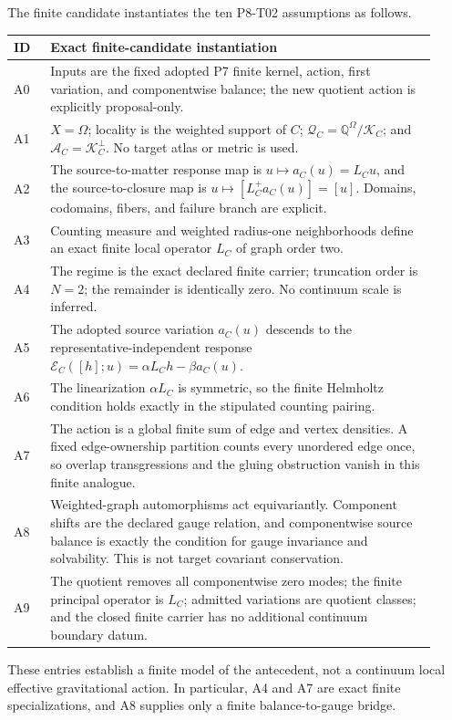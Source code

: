 \documentclass[11pt]{article}
\newcommand{\Q}{\mathbb Q}
\newcommand{\Aspace}{\mathcal A_C}
\newcommand{\Qspace}{\mathcal Q_C}
\newcommand{\Kspace}{\mathcal K_C}
\begin{document}
The finite candidate instantiates the ten P8-T02 assumptions as follows.
\begin{longtable}{p{0.08\linewidth}p{0.84\linewidth}}
\toprule
ID & Exact finite-candidate instantiation\\
\midrule
A0 &
Inputs are the fixed adopted P7 finite kernel, action, first variation, and
componentwise balance; the new quotient action is explicitly proposal-only.\\
A1 &
\(X=\Omega\); locality is the weighted support of \(C\);
\(\Qspace=\Q^\Omega/\Kspace\); and \(\Aspace=\Kspace^\perp\).  No target
atlas or metric is used.\\
A2 &
The source-to-matter response map is \(u\mapsto a_C(u)=L_Cu\), and the
source-to-closure map is \(u\mapsto[L_C^+a_C(u)]=[u]\).  Domains, codomains,
fibers, and failure branch are explicit.\\
A3 &
Counting measure and weighted radius-one neighborhoods define an exact
finite local operator \(L_C\) of graph order two.\\
A4 &
The regime is the exact declared finite carrier; truncation order is
\(N=2\); the remainder is identically zero.  No continuum scale is inferred.\\
A5 &
The adopted source variation \(a_C(u)\) descends to the
representative-independent response
\(\mathcal E_C([h];u)=\alpha L_Ch-\beta a_C(u)\).\\
A6 &
The linearization \(\alpha L_C\) is symmetric, so the finite Helmholtz
condition holds exactly in the stipulated counting pairing.\\
A7 &
The action is a global finite sum of edge and vertex densities.  A fixed
edge-ownership partition counts every unordered edge once, so overlap
transgressions and the gluing obstruction vanish in this finite analogue.\\
A8 &
Weighted-graph automorphisms act equivariantly.  Component shifts are the
declared gauge relation, and componentwise source balance is exactly the
condition for gauge invariance and solvability.  This is not target covariant
conservation.\\
A9 &
The quotient removes all componentwise zero modes; the finite principal
operator is \(L_C\); admitted variations are quotient classes; and the
closed finite carrier has no additional continuum boundary datum.\\
\bottomrule
\end{longtable}

These entries establish a finite model of the antecedent, not a continuum
local effective gravitational action.  In particular, A4 and A7 are exact
finite specializations, and A8 supplies only a finite balance-to-gauge bridge.
\end{document}
